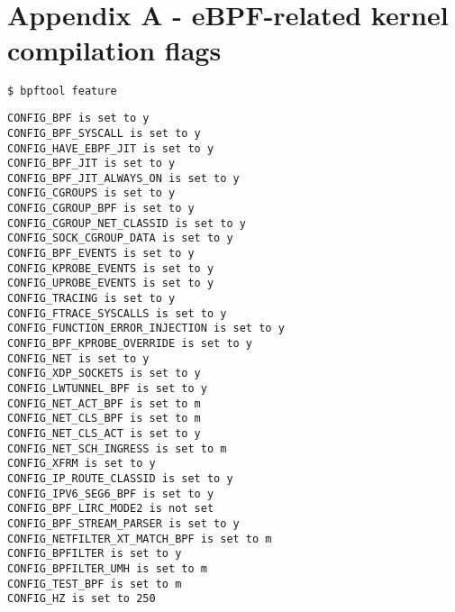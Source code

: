 
%

\appendix
\chapter* {Appendix A - eBPF-related kernel compilation flags} \label{annex:bpftool_flags_kernel}
\begin{lstlisting}[language=bash]
$ bpftool feature
\end{lstlisting}

\begin{verbatim}
CONFIG_BPF is set to y
CONFIG_BPF_SYSCALL is set to y
CONFIG_HAVE_EBPF_JIT is set to y
CONFIG_BPF_JIT is set to y
CONFIG_BPF_JIT_ALWAYS_ON is set to y
CONFIG_CGROUPS is set to y
CONFIG_CGROUP_BPF is set to y
CONFIG_CGROUP_NET_CLASSID is set to y
CONFIG_SOCK_CGROUP_DATA is set to y
CONFIG_BPF_EVENTS is set to y
CONFIG_KPROBE_EVENTS is set to y
CONFIG_UPROBE_EVENTS is set to y
CONFIG_TRACING is set to y
CONFIG_FTRACE_SYSCALLS is set to y
CONFIG_FUNCTION_ERROR_INJECTION is set to y
CONFIG_BPF_KPROBE_OVERRIDE is set to y
CONFIG_NET is set to y
CONFIG_XDP_SOCKETS is set to y
CONFIG_LWTUNNEL_BPF is set to y
CONFIG_NET_ACT_BPF is set to m
CONFIG_NET_CLS_BPF is set to m
CONFIG_NET_CLS_ACT is set to y
CONFIG_NET_SCH_INGRESS is set to m
CONFIG_XFRM is set to y
CONFIG_IP_ROUTE_CLASSID is set to y
CONFIG_IPV6_SEG6_BPF is set to y
CONFIG_BPF_LIRC_MODE2 is not set
CONFIG_BPF_STREAM_PARSER is set to y
CONFIG_NETFILTER_XT_MATCH_BPF is set to m
CONFIG_BPFILTER is set to y
CONFIG_BPFILTER_UMH is set to m
CONFIG_TEST_BPF is set to m
CONFIG_HZ is set to 250
\end{verbatim}


